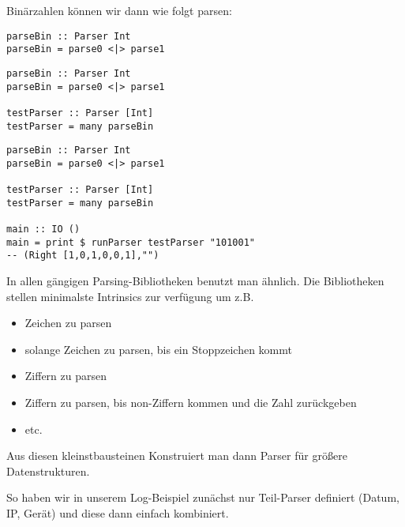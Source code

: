 \documentclass{beamer}
\begin{document}
\begin{frame}[fragile]
Binärzahlen können wir dann wie folgt parsen:
\begin{overprint}
\begin{verbatim}
parseBin :: Parser Int
parseBin = parse0 <|> parse1
\end{verbatim}
\begin{verbatim}
parseBin :: Parser Int
parseBin = parse0 <|> parse1

testParser :: Parser [Int]
testParser = many parseBin
\end{verbatim}
\begin{verbatim}
parseBin :: Parser Int
parseBin = parse0 <|> parse1

testParser :: Parser [Int]
testParser = many parseBin

main :: IO ()
main = print $ runParser testParser "101001"
-- (Right [1,0,1,0,0,1],"")
\end{verbatim}
\end{overprint}
\end{frame}

\begin{frame}[fragile]
In allen gängigen Parsing-Bibliotheken benutzt man ähnlich. Die Bibliotheken stellen minimalste Intrinsics zur verfügung um z.B.
\pause
\begin{itemize}
 \item Zeichen zu parsen
 \pause
 \item solange Zeichen zu parsen, bis ein Stoppzeichen kommt
 \pause
 \item Ziffern zu parsen
 \pause
 \item Ziffern zu parsen, bis non-Ziffern kommen und die Zahl zurückgeben
 \pause
 \item etc.
\end{itemize}
\pause
Aus diesen kleinstbausteinen Konstruiert man dann Parser für größere Datenstrukturen.\\\par
\pause
So haben wir in unserem Log-Beispiel zunächst nur Teil-Parser definiert (Datum, IP, Gerät) und diese dann einfach kombiniert.
\end{frame}
\end{document}
